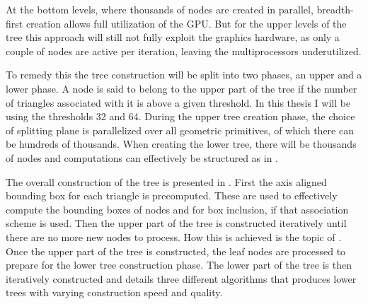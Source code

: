 
At the bottom levels, where thousands of nodes are created in parallel,
breadth-first creation allows full utilization of the GPU. But for the upper
levels of the tree this approach will still not fully exploit the graphics
hardware, as only a couple of nodes are active per iteration, leaving the
multiprocessors underutilized.

To remedy this the tree construction will be split into two phases, an upper and
a lower phase. A node is said to belong to the upper part of the tree if the
number of triangles associated with it is above a given threshold. In this
thesis I will be using the thresholds 32 and 64. During the upper tree creation
phase, the choice of splitting plane is parallelized over all geometric
primitives, of which there can be hundreds of thousands. When creating the lower
tree, there will be thousands of nodes and computations can effectively be
structured as in .


The overall construction of the tree is presented in
. First the axis aligned bounding box for each
triangle is precomputed. These are used to effectively compute the bounding
boxes of nodes and for box inclusion, if that association scheme is used. Then
the upper part of the tree is constructed iteratively until there are no more
new nodes to process. How this is achieved is the topic of
. Once the upper part of the tree is constructed, the
leaf nodes are processed to prepare for the lower tree construction phase. The
lower part of the tree is then iteratively constructed and
 details three different algorithms that produces
lower trees with varying construction speed and quality.

